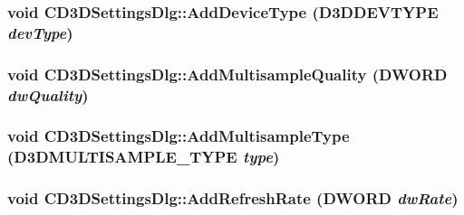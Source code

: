 \label{class_c_d3_d_settings_dlg_afd377864abb5683285ec335fe6011c7a}
\hypertarget{class_c_d3_d_settings_dlg_aa5015f5a50011606b49984cd24baa347}{
\subsubsection[{AddDeviceType}]{\setlength{\rightskip}{0pt plus 5cm}void CD3DSettingsDlg::AddDeviceType (D3DDEVTYPE {\em devType})}}
\label{class_c_d3_d_settings_dlg_aa5015f5a50011606b49984cd24baa347}
\hypertarget{class_c_d3_d_settings_dlg_aecef3b988a7dd637e0a8dece0bd23bc9}{
\subsubsection[{AddMultisampleQuality}]{\setlength{\rightskip}{0pt plus 5cm}void CD3DSettingsDlg::AddMultisampleQuality (DWORD {\em dwQuality})}}
\label{class_c_d3_d_settings_dlg_aecef3b988a7dd637e0a8dece0bd23bc9}
\hypertarget{class_c_d3_d_settings_dlg_a13d7360f5233781dbb2dea92d30a2257}{
\subsubsection[{AddMultisampleType}]{\setlength{\rightskip}{0pt plus 5cm}void CD3DSettingsDlg::AddMultisampleType (D3DMULTISAMPLE\_\-TYPE {\em type})}}
\label{class_c_d3_d_settings_dlg_a13d7360f5233781dbb2dea92d30a2257}
\hypertarget{class_c_d3_d_settings_dlg_a1d0d0f62187b4f88256a866c22755647}{
\subsubsection[{AddRefreshRate}]{\setlength{\rightskip}{0pt plus 5cm}void CD3DSettingsDlg::AddRefreshRate (DWORD {\em dwRate})}}

